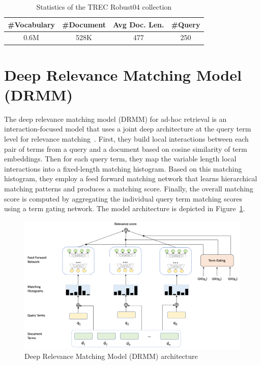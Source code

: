 \begin{table}[]
    \centering
    \begin{tabular}{cccc}
    \toprule
        \#Vocabulary & \#Document & Avg Doc. Len. & \#Query \\
        \midrule
        0.6M & 528K & 477 & 250\\
    \bottomrule
    \end{tabular}
    \caption{Statistics of the TREC Robust04 collection }
    \label{tab:trec_robust04_stats}
\end{table}

\section{Deep Relevance Matching Model (DRMM)}
The deep relevance matching model (DRMM) for ad-hoc retrieval is an interaction-focused model that uses a joint deep architecture at the query term level for relevance matching~\citep{Guo2016}. First, they build local interactions between each pair of terms from a query and a document based on cosine similarity of term embeddings. Then for each query term, they map the variable length local interactions into a fixed-length matching histogram. Based on this matching histogram, they employ a feed forward matching network that learns hierarchical matching patterns and produces a matching score. Finally, the overall matching score is computed by aggregating the individual query term matching scores using a term gating network. The model architecture is depicted in Figure~\ref{fig:drrm_architecture}.
\begin{figure}
    \centering
    \includegraphics[width=15cm]{Figures/drmm_ppt.png}
    \caption{Deep Relevance Matching Model (DRMM) architecture}
    \label{fig:drrm_architecture}
\end{figure}

